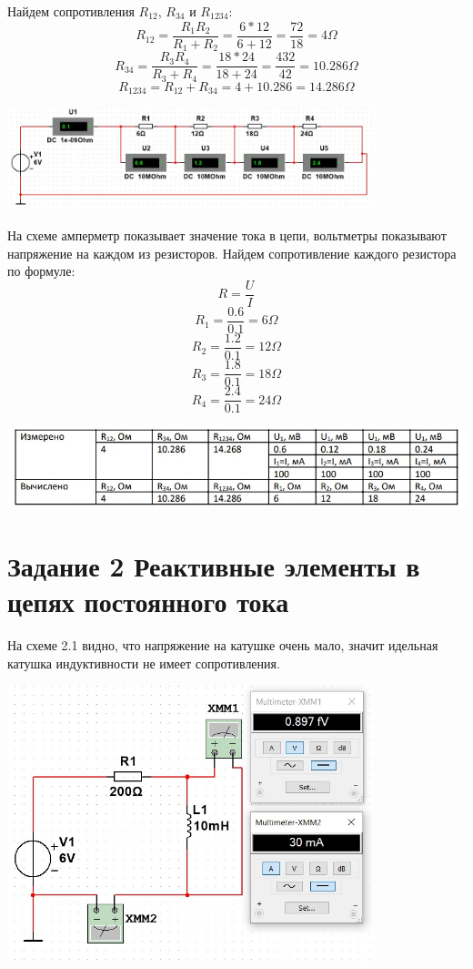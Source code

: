 \documentclass[14pt, a4paper]{article}
\begin{document}
    Найдем сопротивления $R_{12}$, $R_{34}$ и $R_{1234}$:
    $$R_{12} = \frac{R_1R_2}{R_1+R_2} = \frac{6*12}{6+12} = \frac{72}{18} = 4 \Omega$$
    $$R_{34} = \frac{R_3R_4}{R_3+R_4} = \frac{18*24}{18+24} = \frac{432}{42} = 10.286 \Omega$$
    $$R_{1234} = R_{12} + R_{34} = 4 + 10.286 = 14.286 \Omega$$

    {
        \includegraphics[width=0.8\textwidth]{1lab1.2.jpg}
        \centering
    }


    На схеме амперметр показывает значение тока в цепи, 
    вольтметры показывают напряжение на каждом из резисторов. 
    Найдем сопротивление каждого резистора по формуле:
    $$R = \frac{U}{I}$$
    $$R_1 = \frac{0.6}{0.1} = 6 \Omega$$
    $$R_2 = \frac{1.2}{0.1} = 12 \Omega$$
    $$R_3 = \frac{1.8}{0.1} = 18 \Omega$$
    $$R_4 = \frac{2.4}{0.1} = 24 \Omega$$

    {
        \includegraphics[width=\textwidth]{table1.jpg}
        \centering
    }


    \section*{Задание 2 Реактивные элементы в цепях постоянного тока}

    На схеме 2.1 видно, что напряжение
    на катушке очень мало,
    значит идельная катушка индуктивности не имеет сопротивления.

    {
        \includegraphics[width=0.8\textwidth]{1lab2.1.jpg}
        \centering
    }
\end{document}
